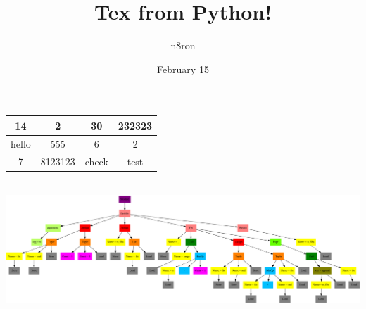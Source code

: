 \documentclass{article}
\title{Tex from Python!}
\author{n8ron}
\date{February 15}
\begin{document}
\maketitle

\begin{tabular}{| c | c | c | c |}
\hline
14 & 2 & 30 & 232323\\
\hline
hello & 555 & 6 & 2\\
\hline
7 & 8123123 & check & test\\
\hline
\end{tabular}
\newline\newline\\
\includegraphics[scale=0.2]{img.png}\\
\end{document}
